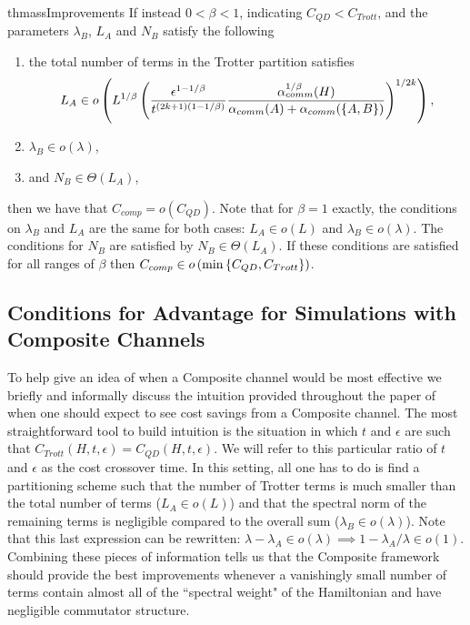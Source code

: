 \begin{restatable}{thm}{assImprovements}
    If instead $0 < \beta < 1$, indicating $C_{QD} < C_{Trott}$, and the parameters
    $\lambda_B$, $L_A$ and $N_B$ satisfy the following
    \begin{enumerate}
        \item the total number of terms in the Trotter partition satisfies
        \begin{equation}
            L_A \in o\left(  L^{1/\beta} \left( \frac{\epsilon^{1-1/\beta}}{t^{(2k+1)(1-1/\beta)}} \frac{\alpha_{comm}^{1/\beta}(H)}{\alpha_{comm}(A) + \alpha_{comm}(\left\{ A,B \right\})}  \right)^{1/2k} \right),
        \end{equation}
        \item $\lambda_B \in o(\lambda)$,
        \item and $N_B \in \Theta(L_A)$,
    \end{enumerate}
    then we have that $C_{comp} = o(C_{QD})$. Note that for $\beta = 1$ exactly, the conditions on $\lambda_B$ and $L_A$ are the same for both cases:
    $L_A \in o(L)$ and $\lambda_B \in o(\lambda)$. The conditions for $N_B$ are satisfied by $N_B \in \Theta(L_A)$.
    If these conditions are satisfied for all ranges of $\beta$ then $C_{comp} \in o \left( \min \left\{ C_{QD}, C_{Trott} \right\} \right)$. 
\end{restatable}

\subsection*{Conditions for Advantage for Simulations with Composite Channels} 
To help give an idea of when a Composite channel would be most effective we briefly and informally discuss the intuition provided throughout the paper of when one should expect to see cost savings from a Composite channel. The most straightforward tool to build intuition is the situation in which $t$ and $\epsilon$ are such that $C_{Trott}(H, t, \epsilon) = C_{QD}(H, t, \epsilon)$. We will refer to this particular ratio of $t$ and $\epsilon$ as the cost crossover time. In this setting, all one has to do is find a partitioning scheme such that the number of Trotter terms is much smaller than the total number of terms ($L_A \in o(L)$) and that the spectral norm of the remaining terms is negligible compared to the overall sum ($\lambda_B \in o(\lambda)$). Note that this last expression can be rewritten: $\lambda - \lambda_A \in o(\lambda) \implies 1 - \lambda_A / \lambda \in o(1)$. Combining these pieces of information tells us that the Composite framework should provide the best improvements whenever a vanishingly small number of terms contain almost all of the ``spectral weight" of the Hamiltonian and have negligible commutator structure.


